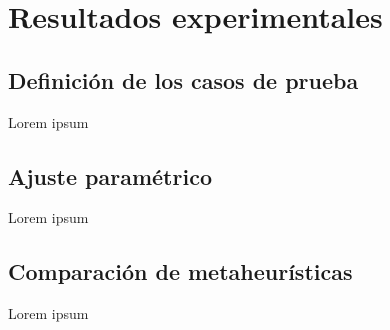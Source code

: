 
\section{Resultados experimentales} \label{capitulo:5}

\subsection{Definición de los casos de prueba}
Lorem ipsum

\subsection{Ajuste paramétrico}
Lorem ipsum

\subsection{Comparación de metaheurísticas}
Lorem ipsum
